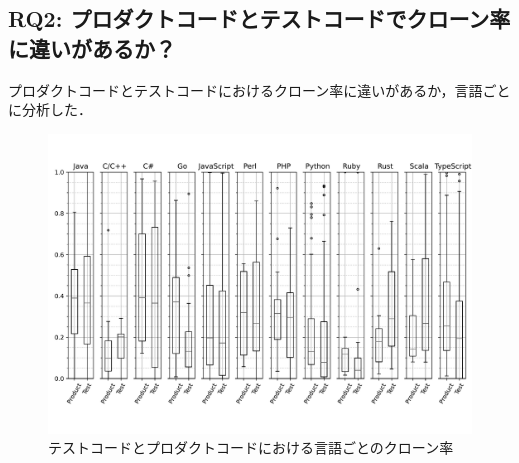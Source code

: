 \documentclass[T,J]{fose}
\begin{document}
\newpage
\subsection{RQ2: プロダクトコードとテストコードでクローン率に違いがあるか？}

プロダクトコードとテストコードにおけるクローン率に違いがあるか，言語ごとに分析した．
\begin{figure}[tb]
    \centering
    \includegraphics[width=\textwidth]{images/RQ2.pdf}
    \caption{テストコードとプロダクトコードにおける言語ごとのクローン率}
    \label{fig:cloneRateOfTestAndProduct}
\end{figure}
\end{document}
